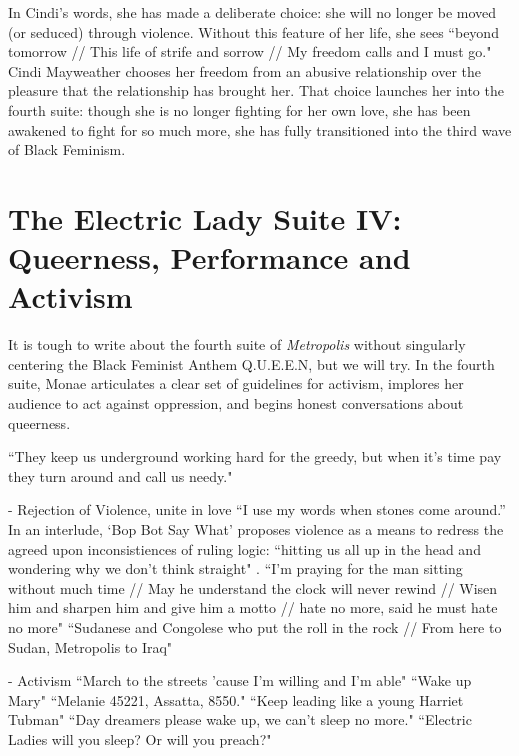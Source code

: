 \documentclass[a4paper, 11pt]{article} %
\begin{document}
In Cindi's words, she has made a deliberate choice: she will no longer be moved (or seduced) through violence. 
Without this feature of her life, she sees ``beyond tomorrow // This life of strife and sorrow // My freedom calls and I must go." \cite{babopbyeya}
Cindi Mayweather chooses her freedom from an abusive relationship over the pleasure that the relationship has brought her.
That choice launches her into the fourth suite: though she is no longer fighting for her own love, she has been awakened to fight for so much more, she has fully transitioned into the third wave of Black Feminism.


\section*{The Electric Lady Suite IV: Queerness, Performance and Activism}

It is tough to write about the fourth suite of \emph{Metropolis} without singularly centering the Black Feminist Anthem Q.U.E.E.N, but we will try.
In the fourth suite, Monae articulates a clear set of guidelines for activism, implores her audience to act against oppression, and begins honest conversations about queerness.


``They keep us underground working hard for the greedy, but when it's time pay they turn around and call us needy." \cite{queen}

- Rejection of Violence, unite in love
``I use my words when stones come around.'' \cite{manymoons}
In an interlude, `Bop Bot Say What' proposes violence as a means to redress the agreed upon inconsistiences of ruling logic: ``hitting us all up in the head and wondering why we don't think straight" \cite{chromeshoppe}.
``I'm praying for the man sitting without much time // May he understand the clock will never rewind // Wisen him and sharpen him and give him a motto // hate no more, said he must hate no more" \cite{danceordie}
``Sudanese and Congolese who put the roll in the rock // From here to Sudan, Metropolis to Iraq" \cite{danceordie}

- Activism
``March to the streets 'cause I'm willing and I'm able" \cite{queen}
``Wake up Mary" \cite{sallyride}
``Melanie 45221, Assatta, 8550." \cite{chromeshoppe}
``Keep leading like a young Harriet Tubman" \cite{queen}
``Day dreamers please wake up, we can't sleep no more." \cite{sincerelyjane}
``Electric Ladies will you sleep? Or will you preach?" \cite{queen}
\end{document}
